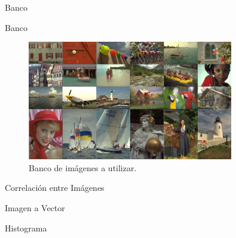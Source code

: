 \documentclass{beamer}
\begin{document}
\begin{frame}{Banco}
    \begin{block}{Banco}
        \begin{figure}[H]
            \centering
            \includegraphics[width=0.8\textwidth]{all_images_grid.png}
            \caption{Banco de im\'agenes a utilizar.}
            \label{fig:rgb2gray_2}
        \end{figure}        
    \end{block}
\end{frame}

\begin{frame}{Correlaci\'on entre Im\'agenes}
    \begin{block}{Imagen a Vector}
        
    \end{block}

    \begin{block}{Histograma}
        
    \end{block}
    
\end{frame}
\end{document}
